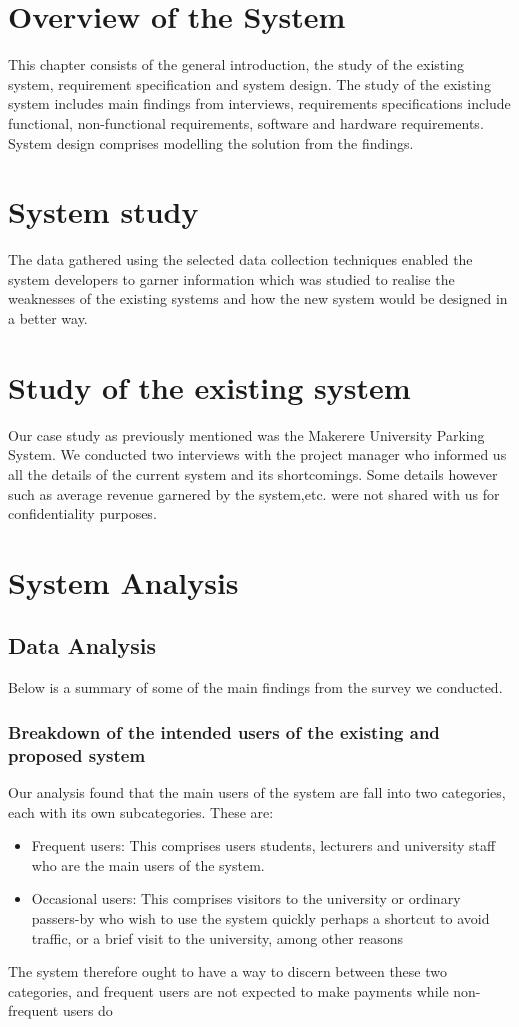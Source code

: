 \section{Overview of the System}
This chapter consists of the general introduction, the study of the existing system, requirement specification and system design. The study of the existing system includes main findings from interviews, requirements specifications include functional, non-functional requirements, software and hardware requirements. System design comprises modelling the solution from the findings.


\section{System study}
The data gathered using the selected data collection techniques enabled the system developers to garner information which was studied to realise the weaknesses of the existing systems and how the new system would be designed in a better way.


\section{Study of the existing system}
Our case study as previously mentioned was the Makerere University Parking System. We conducted two interviews with the project manager who informed us all the details of the current system and its shortcomings. Some details however such as average revenue garnered by the system,etc. were not shared with us for confidentiality purposes.


\section{System Analysis}

\subsection{Data Analysis}
Below is a summary of some of the main findings from the survey we conducted.

\subsubsection{Breakdown of the intended users of the existing and proposed system}
Our analysis found that the main users of the system are fall into two categories, each with its own subcategories. These are:
\begin{itemize}
    \item Frequent users: This comprises users students, lecturers and university staff who are the main users of the system.
    \item Occasional users: This comprises visitors to the university or ordinary passers-by who wish to use the system quickly perhaps a shortcut to avoid traffic, or a brief visit to the university, among other reasons
\end{itemize}
The system therefore ought to have a way to discern between these two categories, and frequent users are not expected to make payments while non-frequent users do


